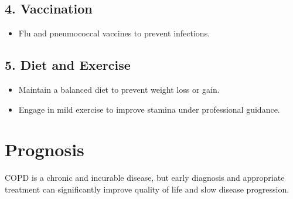 \documentclass{article}
\begin{document}
\subsection*{4. Vaccination}
\begin{itemize}
    \item Flu and pneumococcal vaccines to prevent infections.
\end{itemize}

\subsection*{5. Diet and Exercise}
\begin{itemize}
    \item Maintain a balanced diet to prevent weight loss or gain.
    \item Engage in mild exercise to improve stamina under professional guidance.
\end{itemize}

\section*{Prognosis}
COPD is a chronic and incurable disease, but early diagnosis and appropriate treatment can significantly improve quality of life and slow disease progression.
\end{document}
